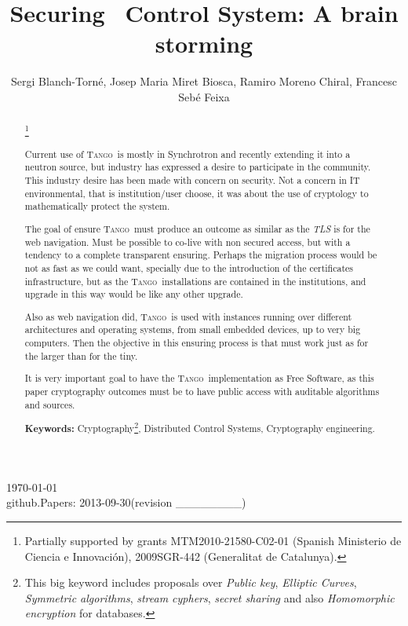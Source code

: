 \documentclass[10pt,a4paper,twoside]{llncs}
\title{Securing \tango\, Control System: A brain storming}
\author{Sergi Blanch-Torn\'e\inst{1}, Josep Maria Miret Biosca\inst{2}, Ramiro Moreno Chiral\inst{2}, Francesc Seb\'e Feixa\inst{2}}
\institute{
 Escola Polit\`ecnica Superior, Universitat de Lleida. Spain.\\
 \email{\tt sblanch@alumnes.udl.es}
 \and 
 Departament de Matem\`atica. Universitat de Lleida. Spain.\\
 \email{\tt \{miret,ramiro,fsebe\}@matematica.udl.es}
 }
\newcommand{\version}{github.Papers: 2013-09-30\;(revision \_\_\_\_\_\_\_\_) } %
\newcommand{\tango}{\textsc{Tango}}
\begin{document}
\maketitle
\begin{center}
 \today\\
 \version
\end{center}


\begin{abstract}\footnote{Partially supported by grants MTM2010-21580-C02-01 (Spanish Ministerio de Ciencia e Innovaci\'on), 2009SGR-442 (Generalitat de Catalunya).}

Current use of \tango\, is mostly in Synchrotron and recently extending it into a neutron source, but industry has expressed a desire to participate in the community. This industry desire has been made with concern on security. Not a concern in IT environmental, that is institution/user choose, it was about the use of cryptology to mathematically protect the system.

The goal of ensure \tango\, must produce an outcome as similar as the \emph{TLS} is for the web navigation. Must be possible to co-live with non secured access, but with a tendency to a complete transparent ensuring. Perhaps the migration process would be not as fast as we could want, specially due to the introduction of the certificates infrastructure, but as the \tango\, installations are contained in the institutions, and upgrade in this way would be like any other upgrade.

Also as web navigation did, \tango\, is used with instances running over different architectures and operating systems, from small embedded devices, up to very big computers. Then the objective in this ensuring process is that must work just as for the larger than for the tiny.

It is very important goal to have the \tango\, implementation as Free Software, as this paper cryptography outcomes must be to have public access with auditable algorithms and sources.
   
{\bf Keywords:} Cryptography\footnote{This big keyword includes proposals over \emph{Public key}, \emph{Elliptic Curves}, \emph{Symmetric algorithms}, \emph{stream cyphers}, \emph{secret sharing} and also \emph{Homomorphic encryption} for databases.}, Distributed Control Systems, Cryptography engineering.

\end{abstract}

\end{document}
